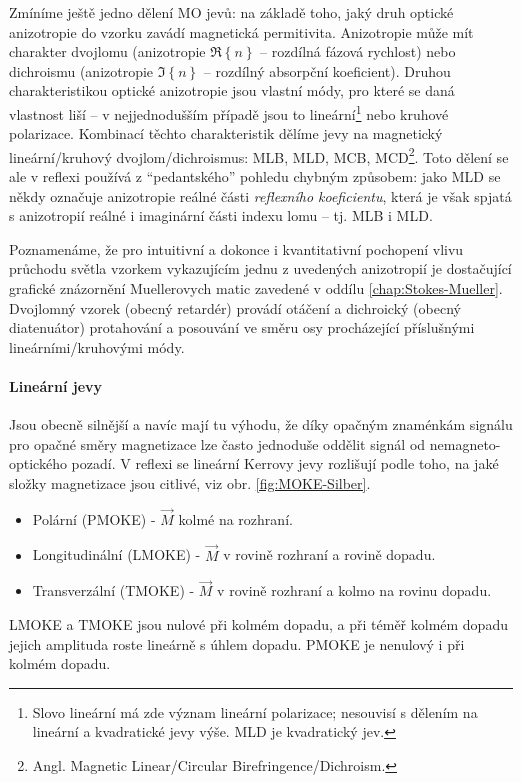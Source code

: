 Zmíníme ještě jedno dělení MO jevů: na základě toho, jaký druh optické anizotropie do vzorku zavádí magnetická permitivita\cite{zvezdinModernMagnetoopticsMagnetooptical1997}.
Anizotropie může mít charakter dvojlomu (anizotropie $\Re\left\lbrace n\right\rbrace$ -- rozdílná fázová rychlost) nebo dichroismu (anizotropie $\Im\left\lbrace n \right\rbrace$ -- rozdílný absorpční koeficient).
Druhou charakteristikou optické anizotropie jsou vlastní módy, pro které se daná vlastnost liší -- v nejjednodušším případě jsou to lineární\footnote{Slovo lineární má zde význam lineární polarizace; nesouvisí s dělením na lineární a kvadratické jevy výše. MLD je kvadratický jev.} nebo kruhové polarizace.
Kombinací těchto charakteristik dělíme jevy na magnetický lineární/kruhový dvojlom/dichroismus: MLB, MLD, MCB, MCD\footnote{Angl. Magnetic Linear/Circular Birefringence/Dichroism.}.
Toto dělení se ale v reflexi používá z ``pedantského'' pohledu chybným způsobem: jako MLD se někdy označuje anizotropie reálné části \emph{reflexního koeficientu}, která je však spjatá s anizotropií reálné i imaginární části indexu lomu -- tj. MLB i MLD\cite{tesarovaSystematicStudyMagnetic2014}.

Poznamenáme, že pro intuitivní a dokonce i kvantitativní pochopení vlivu průchodu světla vzorkem vykazujícím jednu z uvedených anizotropií je dostačující grafické znázornění Muellerovych matic zavedené v oddílu \ref{chap:Stokes-Mueller}.
Dvojlomný vzorek (obecný retardér) provádí otáčení a dichroický (obecný diatenuátor) protahování a posouvání ve směru osy procházející příslušnými lineárními/kruhovými módy.

\paragraph{Lineární jevy}

Jsou obecně silnější a navíc mají tu výhodu, že díky opačným znaménkám signálu pro opačné směry magnetizace lze často jednoduše oddělit signál od nemagneto-optického pozadí.
V reflexi se lineární Kerrovy jevy rozlišují podle toho, na jaké složky magnetizace jsou citlivé, viz obr. \ref{fig:MOKE-Silber}\cite{silberQuadraticMagnetoopticKerr2019a}.
\begin{itemize}
    \item Polární (PMOKE) - $\vec{M}$ kolmé na rozhraní.
    \item Longitudinální (LMOKE) - $\vec{M}$ v rovině rozhraní a rovině dopadu.
    \item Transverzální (TMOKE) - $\vec{M}$ v rovině rozhraní a kolmo na rovinu dopadu.
\end{itemize}
LMOKE a TMOKE jsou nulové při kolmém dopadu, a při téměř kolmém dopadu jejich amplituda roste lineárně s úhlem dopadu.
PMOKE je nenulový i při kolmém dopadu.


